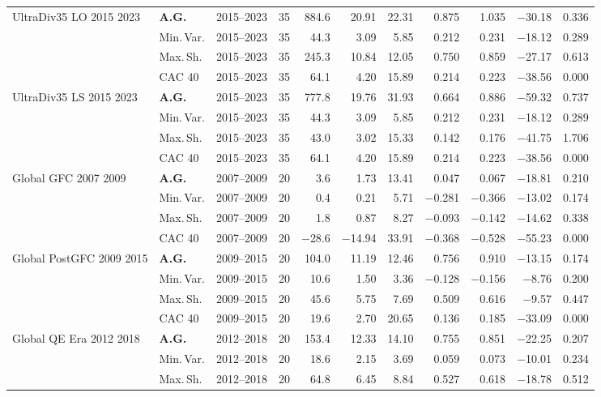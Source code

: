 \begin{longtable}{p{2.6cm} l c c r r r r r r r}
\midrule
UltraDiv35 LO 2015 2023 & \textbf{A.G.} & 2015--2023 & 35 & 884.6 & 20.91 & 22.31 & 0.875 & 1.035 & $-$30.18 & 0.336 \\
 & Min.\,Var. & 2015--2023 & 35 & 44.3 & 3.09 & 5.85 & 0.212 & 0.231 & $-$18.12 & 0.289 \\
 & Max.\,Sh. & 2015--2023 & 35 & 245.3 & 10.84 & 12.05 & 0.750 & 0.859 & $-$27.17 & 0.613 \\
 & CAC 40 & 2015--2023 & 35 & 64.1 & 4.20 & 15.89 & 0.214 & 0.223 & $-$38.56 & 0.000 \\
\midrule
UltraDiv35 LS 2015 2023 & \textbf{A.G.} & 2015--2023 & 35 & 777.8 & 19.76 & 31.93 & 0.664 & 0.886 & $-$59.32 & 0.737 \\
 & Min.\,Var. & 2015--2023 & 35 & 44.3 & 3.09 & 5.85 & 0.212 & 0.231 & $-$18.12 & 0.289 \\
 & Max.\,Sh. & 2015--2023 & 35 & 43.0 & 3.02 & 15.33 & 0.142 & 0.176 & $-$41.75 & 1.706 \\
 & CAC 40 & 2015--2023 & 35 & 64.1 & 4.20 & 15.89 & 0.214 & 0.223 & $-$38.56 & 0.000 \\
\midrule
Global GFC 2007 2009 & \textbf{A.G.} & 2007--2009 & 20 & 3.6 & 1.73 & 13.41 & 0.047 & 0.067 & $-$18.81 & 0.210 \\
 & Min.\,Var. & 2007--2009 & 20 & 0.4 & 0.21 & 5.71 & $-$0.281 & $-$0.366 & $-$13.02 & 0.174 \\
 & Max.\,Sh. & 2007--2009 & 20 & 1.8 & 0.87 & 8.27 & $-$0.093 & $-$0.142 & $-$14.62 & 0.338 \\
 & CAC 40 & 2007--2009 & 20 & $-$28.6 & $-$14.94 & 33.91 & $-$0.368 & $-$0.528 & $-$55.23 & 0.000 \\
\midrule
Global PostGFC 2009 2015 & \textbf{A.G.} & 2009--2015 & 20 & 104.0 & 11.19 & 12.46 & 0.756 & 0.910 & $-$13.15 & 0.174 \\
 & Min.\,Var. & 2009--2015 & 20 & 10.6 & 1.50 & 3.36 & $-$0.128 & $-$0.156 & $-$8.76 & 0.200 \\
 & Max.\,Sh. & 2009--2015 & 20 & 45.6 & 5.75 & 7.69 & 0.509 & 0.616 & $-$9.57 & 0.447 \\
 & CAC 40 & 2009--2015 & 20 & 19.6 & 2.70 & 20.65 & 0.136 & 0.185 & $-$33.09 & 0.000 \\
\midrule
Global QE Era 2012 2018 & \textbf{A.G.} & 2012--2018 & 20 & 153.4 & 12.33 & 14.10 & 0.755 & 0.851 & $-$22.25 & 0.207 \\
 & Min.\,Var. & 2012--2018 & 20 & 18.6 & 2.15 & 3.69 & 0.059 & 0.073 & $-$10.01 & 0.234 \\
 & Max.\,Sh. & 2012--2018 & 20 & 64.8 & 6.45 & 8.84 & 0.527 & 0.618 & $-$18.78 & 0.512 \\

\end{longtable}
